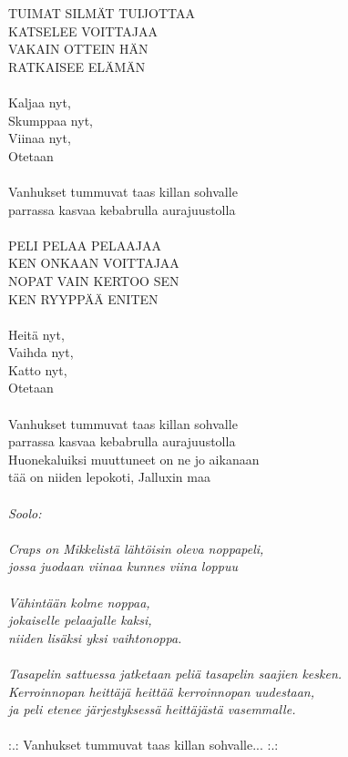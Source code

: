 
TUIMAT SILMÄT TUIJOTTAA \\
KATSELEE VOITTAJAA \\
VAKAIN OTTEIN HÄN \\
RATKAISEE ELÄMÄN \\
\hspace{10mm}\\
Kaljaa nyt, \\
Skumppaa nyt, \\
Viinaa nyt, \\
Otetaan \\
\hspace{10mm}\\
Vanhukset tummuvat taas killan sohvalle \\
parrassa kasvaa kebabrulla aurajuustolla \\
\hspace{10mm}\\
PELI PELAA PELAAJAA \\
KEN ONKAAN VOITTAJAA \\
NOPAT VAIN KERTOO SEN \\
KEN RYYPPÄÄ ENITEN \\
\hspace{10mm}\\
Heitä nyt, \\
Vaihda nyt, \\
Katto nyt, \\
Otetaan \\
\hspace{10mm}\\
Vanhukset tummuvat taas killan sohvalle \\
parrassa kasvaa kebabrulla aurajuustolla \\
Huonekaluiksi muuttuneet on ne jo aikanaan \\
tää on niiden lepokoti, Jalluxin maa \\
\hspace{10mm}\\
\textit{Soolo:\\
\hspace{10mm}\\
Craps on Mikkelistä lähtöisin oleva noppapeli, \\
jossa juodaan viinaa kunnes viina loppuu \\
\hspace{10mm}\\
Vähintään kolme noppaa, \\
jokaiselle pelaajalle kaksi, \\
niiden lisäksi yksi vaihtonoppa. \\
\hspace{10mm}\\
Tasapelin sattuessa jatketaan peliä tasapelin saajien kesken. \\
Kerroinnopan heittäjä heittää kerroinnopan uudestaan, \\
ja peli etenee järjestyksessä heittäjästä vasemmalle.} \\
\hspace{10mm}\\
:.: Vanhukset tummuvat taas killan sohvalle... :.: \\
